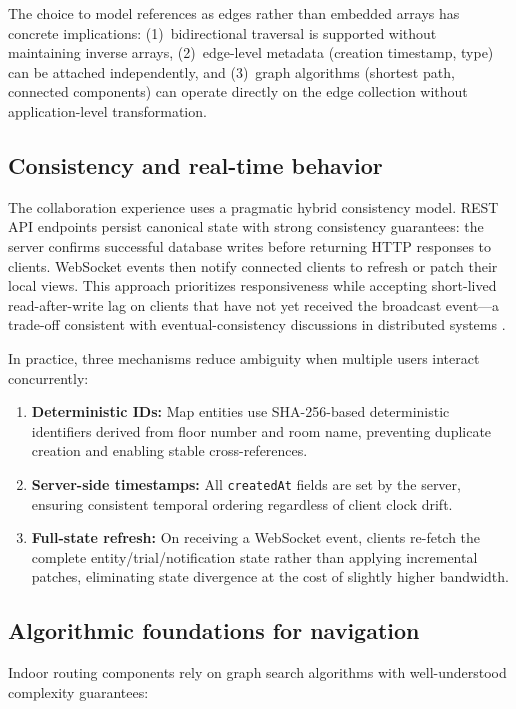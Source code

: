 \documentclass[13pt,a4paper]{report}
\begin{document}
The choice to model references as edges rather than embedded arrays has concrete implications: (1)~bidirectional traversal is supported without maintaining inverse arrays, (2)~edge-level metadata (creation timestamp, type) can be attached independently, and (3)~graph algorithms (shortest path, connected components) can operate directly on the edge collection without application-level transformation.

\subsection{Consistency and real-time behavior}
The collaboration experience uses a pragmatic hybrid consistency model. REST API endpoints persist canonical state with strong consistency guarantees: the server confirms successful database writes before returning HTTP responses to clients. WebSocket events then notify connected clients to refresh or patch their local views. This approach prioritizes responsiveness while accepting short-lived read-after-write lag on clients that have not yet received the broadcast event---a trade-off consistent with eventual-consistency discussions in distributed systems \cite{vogels2009eventually}.

In practice, three mechanisms reduce ambiguity when multiple users interact concurrently:
\begin{enumerate}
    \item \textbf{Deterministic IDs:} Map entities use SHA-256-based deterministic identifiers derived from floor number and room name, preventing duplicate creation and enabling stable cross-references.
    \item \textbf{Server-side timestamps:} All \texttt{createdAt} fields are set by the server, ensuring consistent temporal ordering regardless of client clock drift.
    \item \textbf{Full-state refresh:} On receiving a WebSocket event, clients re-fetch the complete entity/trial/notification state rather than applying incremental patches, eliminating state divergence at the cost of slightly higher bandwidth.
\end{enumerate}

\subsection{Algorithmic foundations for navigation}
Indoor routing components rely on graph search algorithms with well-understood complexity guarantees:
\end{document}
